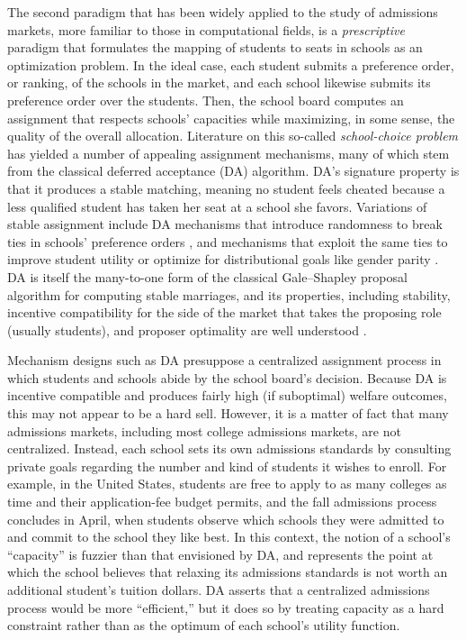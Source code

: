 \documentclass[12pt]{article}
\numberwithin{equation}{subsection}
\theoremstyle{definition}
\begin{document}
The second paradigm that has been widely applied to the study of admissions markets, more familiar to those in computational fields, is a \emph{prescriptive} paradigm that formulates the mapping of students to seats in schools as an optimization problem. In the ideal case, each student submits a preference order, or ranking, of the schools in the market, and each school likewise submits its preference order over the students. Then, the school board computes an assignment that respects schools' capacities while maximizing, in some sense, the quality of the overall allocation. Literature on this so-called \emph{school-choice problem} has yielded a number of appealing assignment mechanisms, many of which stem from the classical deferred acceptance (DA) algorithm. DA's signature property is that it produces a stable matching, meaning no student feels cheated because a less qualified student has taken her seat at a school she favors. Variations of stable assignment include DA mechanisms that introduce randomness to break ties in schools' preference orders \parencite[][]{whatmatters}, and mechanisms that exploit the same ties to improve student utility \parencite[][]{expandingchoice} or optimize for distributional goals like gender parity \parencite[][]{distributionalgoals}. DA is itself the many-to-one form of the classical Gale--Shapley proposal algorithm for computing stable marriages, and its properties, including stability, incentive compatibility for the side of the market that takes the proposing role (usually students), and proposer optimality are well understood \parencite[][]{galeshapley1962, economicsofmatching}.

Mechanism designs such as DA presuppose a centralized assignment process in which students and schools abide by the school board's decision. Because DA is incentive compatible and produces fairly high (if suboptimal) welfare outcomes, this may not appear to be a hard sell. However, it is a matter of fact that many admissions markets, including most college admissions markets, are not centralized. Instead, each school sets its own admissions standards by consulting private goals regarding the number and kind of students it wishes to enroll. For example, in the United States, students are free to apply to as many colleges as time and their application-fee budget permits, and the fall admissions process concludes in April, when students observe which schools they were admitted to and commit to the school they like best. In this context, the notion of a school's ``capacity'' is fuzzier than that envisioned by DA, and represents the point at which the school believes that relaxing its admissions standards is not worth an additional student's tuition dollars. DA asserts that a centralized admissions process would be more ``efficient,'' but it does so by treating capacity as a hard constraint rather than as the optimum of each school's utility function. 
\end{document}
